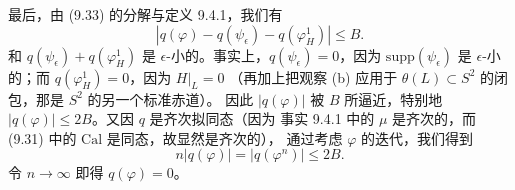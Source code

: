 \begin{wproof}
最后，由 (9.33) 的分解与定义 9.4.1，我们有
\[
  |q(\varphi)-q(\psi_\epsilon)-q(\varphi_H^1)|\le B .
\]
和 $q(\psi_\epsilon)+q(\varphi_H^1)$ 是 $\epsilon$-小的。事实上，$q(\psi_\epsilon)=0$，因为
$\mathrm{supp}(\psi_\epsilon)$ 是 $\epsilon$-小的；而 $q(\varphi_H^1)=0$，因为 $H|_L=0$
（再加上把观察 (b) 应用于 $\theta(L)\subset S^2$ 的闭包，那是 $S^2$ 的另一个标准赤道）。
因此 $|q(\varphi)|$ 被 $B$ 所逼近，特别地 $|q(\varphi)|\le2B$。又因 $q$ 是齐次拟同态（因为
事实 9.4.1 中的 $\mu$ 是齐次的，而 (9.31) 中的 $\mathrm{Cal}$ 是同态，故显然是齐次的），
通过考虑 $\varphi$ 的迭代，我们得到
\[
  n|q(\varphi)|=|q(\varphi^n)|\le2B .
\]
令 $n\to\infty$ 即得 $q(\varphi)=0$。
\end{wproof}
